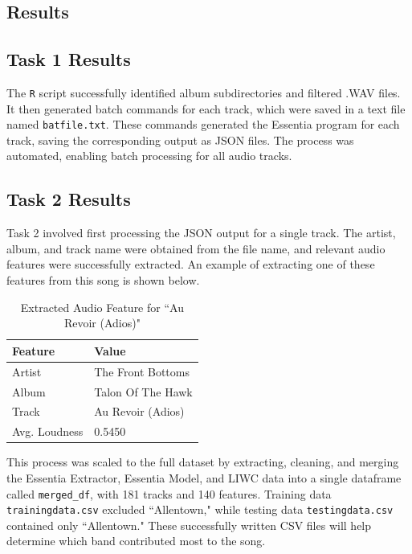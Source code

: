 \documentclass{article}\usepackage[]{graphicx}\usepackage[]{xcolor}
\begin{document}
\begin{multicols}{2}
\section{Results}

\subsection{Task 1 Results}
The \texttt{R} script successfully identified album subdirectories and filtered .WAV files. It then generated batch commands for each track, which were saved in a text file named \texttt{batfile.txt}. These commands generated the Essentia program for each track, saving the corresponding output as JSON files. The process was automated, enabling batch processing for all audio tracks.

\columnbreak


\subsection{Task 2 Results}
Task 2 involved first processing the JSON output for a single track. The artist, album, and track name were obtained from the file name, and relevant audio features were successfully extracted. An example of extracting one of these features from this song is shown below.


\begin{table}[H]
    \centering
    \begin{tabular}{|l|l|}
        \hline
        \textbf{Feature} & \textbf{Value} \\
        \hline
        Artist & The Front Bottoms \\
        Album & Talon Of The Hawk \\
        Track & Au Revoir (Adios) \\
        Avg. Loudness & 0.5450 \\
        \hline
    \end{tabular}
    \caption{Extracted Audio Feature for ``Au Revoir (Adios)"}
    \label{tab:audio_features}
\end{table}

This process was scaled to the full dataset by extracting, cleaning, and merging the Essentia Extractor, Essentia Model, and LIWC data into a single dataframe called \texttt{merged\_df}, with 181 tracks and 140 features. Training data \texttt{trainingdata.csv} excluded ``Allentown," while testing data \texttt{testingdata.csv} contained only ``Allentown." These successfully written CSV files will help determine which band contributed most to the song. 



\end{multicols}
\end{document}
